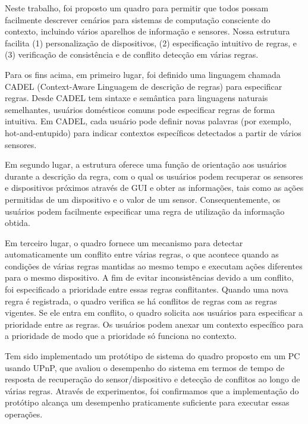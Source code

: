 \documentclass[12pt,a4paper,compsoc]{IEEEtran}
\begin{document}
Neste trabalho, foi proposto um quadro para permitir que todos possam facilmente descrever cenários para sistemas de computação consciente do contexto, incluindo vários aparelhos de informação e sensores. Nossa estrutura facilita (1) personalização de dispositivos, (2) especificação intuitivo de regras, e (3) verificação de consistência e de conflito detecção em várias regras.

Para os fins acima, em primeiro lugar, foi definido uma linguagem chamada CADEL (Context-Aware Linguagem de descrição de regras) para especificar regras. Desde CADEL tem sintaxe e semântica para linguagens naturais semelhantes, usuários domésticos comuns pode especificar regras de forma intuitiva. Em CADEL, cada usuário pode definir novas palavras (por exemplo, hot-and-entupido) para indicar contextos específicos detectados a partir de vários sensores.

Em segundo lugar, a estrutura oferece uma função de orientação aos usuários durante a descrição da regra, com o qual os usuários podem recuperar os sensores e dispositivos próximos através de GUI e obter as informações, tais como as ações permitidas de um dispositivo e o valor de um sensor. Consequentemente, os usuários podem facilmente especificar uma regra de utilização da informação obtida.

Em terceiro lugar, o quadro fornece um mecanismo para detectar automaticamente um conflito entre várias regras, o que acontece quando as condições de várias regras mantidas ao mesmo tempo e executam ações diferentes para o mesmo dispositivo. A fim de evitar inconsistências devido a um conflito, foi especificado a prioridade entre essas regras conflitantes. Quando uma nova regra é registrada, o quadro verifica se há conflitos de regras com as regras vigentes. Se ele entra em conflito, o quadro solicita aos usuários para especificar a prioridade entre as regras. Os usuários podem anexar um contexto específico para a prioridade de modo que a prioridade só funciona no contexto.

Tem sido implementado um protótipo de sistema do quadro proposto em um PC usando UPnP, que avaliou o desempenho do sistema em termos de tempo de resposta de recuperação do sensor/dispositivo e detecção de conflitos ao longo de várias regras. Através de experimentos, foi confirmamos que a implementação do protótipo alcança um desempenho praticamente suficiente para executar essas operações.


\end{document}
